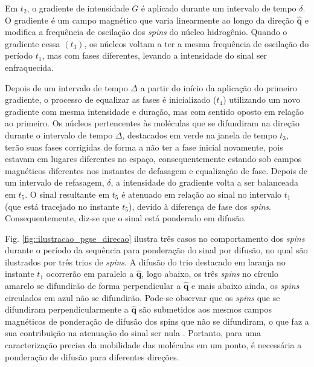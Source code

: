 \documentclass[
    12pt,                %
    oneside,            %
    a4paper,            %
    english,            %
    french,                %
    spanish,            %
    brazil                %
    ]{abntex2}
\begin{document}

Em $t_2$, o gradiente de intensidade $G$ é aplicado durante um intervalo de tempo $\delta$. O gradiente é um campo magnético que varia linearmente ao longo da direção $\mathbf{\hat{q}}$ e modifica a frequência de oscilação dos \textit{spins} do núcleo hidrogênio. Quando o gradiente cessa $(t_3)$, os núcleos voltam a ter a mesma frequência de oscilação do período $t_1$, mas com fases diferentes, levando a intensidade do sinal ser enfraquecida.

Depois de um intervalo de tempo $\Delta$ a partir do início da aplicação do primeiro gradiente, o processo de equalizar as fases é inicializado ($t_4$) utilizando um novo gradiente com mesma intensidade e duração, mas com sentido oposto em relação ao primeiro. Os núcleos pertencentes às moléculas que se difundiram na direção durante o intervalo de tempo $\Delta$, destacados em verde na janela de tempo $t_3$, terão suas fases corrigidas de forma a não ter a fase inicial novamente, pois estavam em lugares diferentes no espaço, consequentemente estando sob campos magnéticos diferentes nos instantes de defasagem e equalização de fase. Depois de um intervalo de refasagem, $\delta$, a intensidade do gradiente volta a ser balanceada em $t_5$.
O sinal resultante em $t_5$ é atenuado em relação ao sinal no intervalo $t_1$ (que está tracejado no instante $t_5$), devido à diferença de fase dos \textit{spins}. Consequentemente, diz-se que o sinal está ponderado em difusão.

Fig. \ref{fig::ilustracao_pgse_direcao} ilustra três casos no comportamento dos \textit{spins} durante o período da sequência para ponderação do sinal por difusão, no qual são ilustrados por três trios de \textit{spins}. A difusão do trio destacado em laranja no instante $t_1$ ocorrerão em paralelo a $\mathbf{\hat{q}}$, logo abaixo, os três \textit{spins} no círculo amarelo se difundirão de forma perpendicular a $\mathbf{\hat{q}}$ e mais abaixo ainda, os \textit{spins} circulados em azul não se difundirão. Pode-se observar que os \textit{spins} que se difundiram perpendicularmente a $\mathbf{\hat{q}}$ são submetidos aos mesmos campos magnéticos de ponderação de difusão dos spins que não se difundiram, o que faz a sua contribuição na atenuação do sinal ser nula \cite{mori2013}. Portanto, para uma caracterização precisa da mobilidade das moléculas em um ponto, é necessária a ponderação de difusão para diferentes direções.
\end{document}
